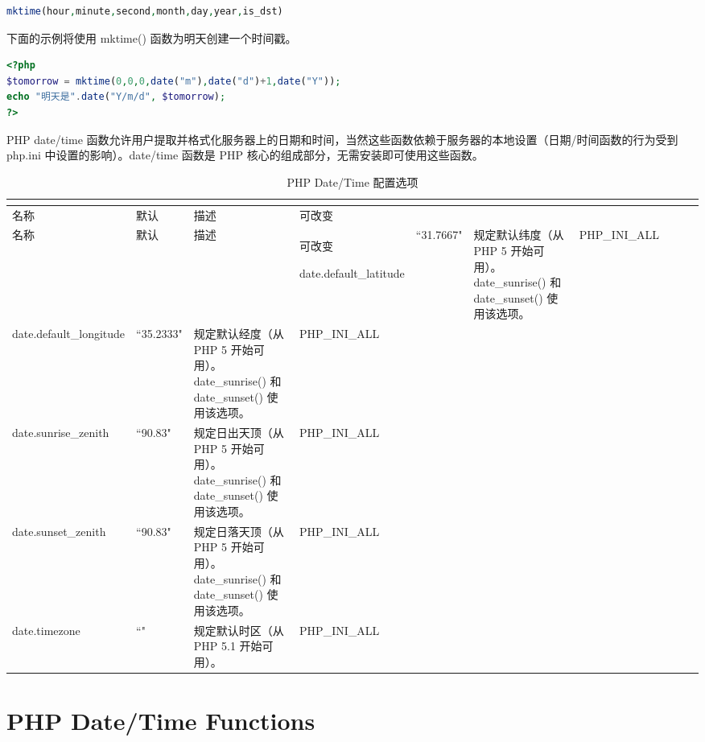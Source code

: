 \begin{lstlisting}[language=PHP]
mktime(hour,minute,second,month,day,year,is_dst)
\end{lstlisting}

下面的示例将使用 mktime() 函数为明天创建一个时间戳。


\begin{lstlisting}[language=PHP]
<?php
$tomorrow = mktime(0,0,0,date("m"),date("d")+1,date("Y"));
echo "明天是".date("Y/m/d", $tomorrow);
?>
\end{lstlisting}

PHP date/time 函数允许用户提取并格式化服务器上的日期和时间，当然这些函数依赖于服务器的本地设置（日期/时间函数的行为受到 php.ini 中设置的影响）。date/time 函数是 PHP 核心的组成部分，无需安装即可使用这些函数。


\begin{longtable}{|m{90pt}|m{40pt}|m{180pt}|m{60pt}|}
\tabularnewline\hline
名称	&默认	&描述	&可改变
\endhead

\caption{PHP Date/Time 配置选项}\\
\hline
名称	&默认	&描述	&可改变
\endfirsthead

\endfoot

\endlastfoot

\hline
date.default\_latitude	 &``31.7667"	&规定默认纬度（从 PHP 5 开始可用）。date\_sunrise() 和 date\_sunset() 使用该选项。	&PHP\_INI\_ALL\\
\hline
date.default\_longitude	&``35.2333"	&规定默认经度（从 PHP 5 开始可用）。date\_sunrise() 和 date\_sunset() 使用该选项。	&PHP\_INI\_ALL\\
\hline
date.sunrise\_zenith		&``90.83"	&规定日出天顶（从 PHP 5 开始可用）。date\_sunrise() 和 date\_sunset() 使用该选项。	&PHP\_INI\_ALL\\
\hline
date.sunset\_zenith		&``90.83"	&规定日落天顶（从 PHP 5 开始可用）。date\_sunrise() 和 date\_sunset() 使用该选项。	&PHP\_INI\_ALL\\
\hline
date.timezone			&``"	&规定默认时区（从 PHP 5.1 开始可用）。	&PHP\_INI\_ALL\\
\hline
\end{longtable}






\section{PHP Date/Time Functions}







